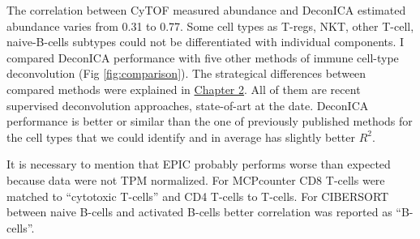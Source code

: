 \documentclass[12pt,]{book}
\theoremstyle{definition}
\theoremstyle{definition}
\theoremstyle{definition}
\theoremstyle{remark}
\begin{document}
The correlation between CyTOF measured abundance and DeconICA estimated
abundance varies from 0.31 to 0.77. Some cell types as T-regs, NKT,
other T-cell, naive-B-cells subtypes could not be differentiated with
individual components. I compared DeconICA performance with five other
methods of immune cell-type deconvolution (Fig \ref{fig:comparison}).
The strategical differences between compared methods were explained in
\protect\hyperlink{methods}{Chapter 2}. All of them are recent
supervised deconvolution approaches, state-of-art at the date. DeconICA
performance is better or similar than the one of previously published
methods for the cell types that we could identify and in average has
slightly better \(R^2\).

It is necessary to mention that EPIC probably performs worse than
expected because data were not TPM normalized. For MCPcounter CD8
T-cells were matched to ``cytotoxic T-cells'' and CD4 T-cells to
T-cells. For CIBERSORT between naive B-cells and activated B-cells
better correlation was reported as ``B-cells''.
\end{document}
